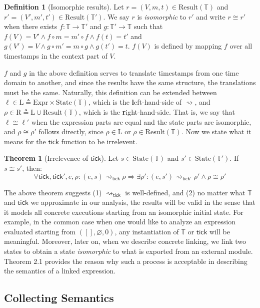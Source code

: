 \documentclass[acmsmall,review]{acmart}\settopmatter{printfolios=true,printccs=false,printacmref=false}
\theoremstyle{definition}
\newtheorem{definition}{Definition}[section]
\newtheorem{thm}{Theorem}[section]
\newcommand*{\Expr}{\text{Expr}}
\newcommand*{\Time}{\mathbb{T}}
\newcommand*{\Left}{\text{L}}
\newcommand*{\Right}{\text{R}}
\newcommand*{\mem}{m}
\newcommand*{\State}{\text{State}}
\newcommand*{\Result}{\text{Result}}
\newcommand*{\tick}{\mathsf{tick}}
\begin{document}
\begin{definition}[Isomorphic results]
  Let $r=(V,\mem,t)\in\Result(\Time)$ and $r'=(V',\mem',t')\in\Result(\Time')$.
  We say $r$ is \emph{isomorphic} to $r'$ and write $r\cong r'$ when there exists $f:\Time\rightarrow\Time'$ and $g:\Time'\rightarrow\Time$ such that
  $f(V)=V'\wedge f\circ\mem=\mem'\circ f\wedge f(t)=t'$ and $g(V')=V\wedge g\circ\mem'=\mem\circ g\wedge g(t')=t$.
  $f(V)$ is defined by mapping $f$ over all timestamps in the context part of $V$.
\end{definition}

$f$ and $g$ in the above definition serves to translate timestamps from one time domain to another, and since the results have the same structure, the translations must be the same.
Naturally, this definition can be extended between $\ell\in\Left\triangleq\Expr\times\State(\Time)$, which is the \textbf{l}eft-hand-side of $\rightsquigarrow$, and $\rho\in\Right\triangleq\Left\cup\Result(\Time)$, which is the \textbf{r}ight-hand-side.
That is, we say that $\ell\cong\ell'$ when the expression parts are equal and the state parts are isomorphic, and
$\rho\cong\rho'$ follows directly, since $\rho\in\Left$ or $\rho\in\Result(\Time)$.
Now we state what it means for the $\tick$ function to be irrelevent.

\begin{thm}[Irrelevence of $\tick$]
  Let $s\in\State(\Time)$ and $s'\in\State(\Time')$.
  If $s\cong s'$, then:
  \[\forall\tick,\tick',e,\rho:(e,s)\rightsquigarrow_\tick\rho\Rightarrow\exists\rho':(e,s')\rightsquigarrow_{\tick'}\rho'\wedge\rho\cong\rho'\]
\end{thm}

The above theorem suggests (1) $\rightsquigarrow_\tick$ is well-defined, and (2) no matter what $\Time$ and $\tick$ we approximate in our analysis, the results will be valid in the sense that it models all concrete executions starting from an isomorphic initial state.
For example, in the common case when one would like to analyze an expression evaluated starting from $([],\varnothing,0)$, any instantiation of $\Time$ or $\tick$ will be meaningful.
Moreover, later on, when we describe concrete linking, we link two states to obtain a state \emph{isomorphic} to what is exported from an external module.
Theorem 2.1 provides the reason why such a process is acceptable in describing the semantics of a linked expression.

\subsection{Collecting Semantics}
\end{document}
